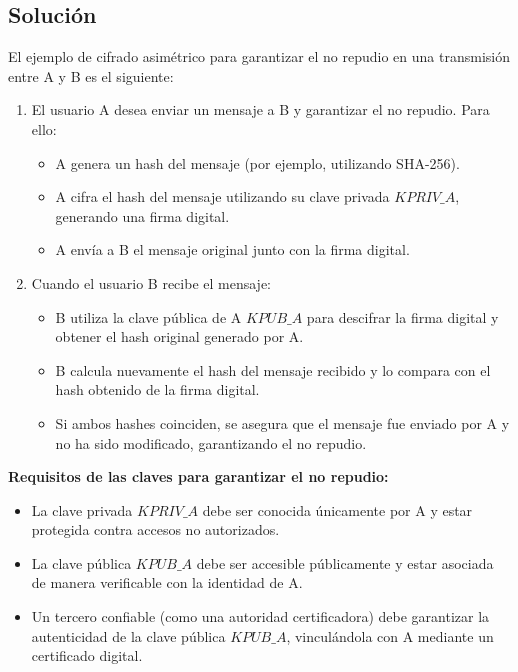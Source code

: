 \documentclass[12pt]{article}
\begin{document}
\subsection{Solución}
El ejemplo de cifrado asimétrico para garantizar el no repudio en una transmisión entre A y B es el siguiente:

\begin{enumerate}
    \item El usuario A desea enviar un mensaje a B y garantizar el no repudio. Para ello:
    \begin{itemize}
        \item A genera un hash del mensaje (por ejemplo, utilizando SHA-256).
        \item A cifra el hash del mensaje utilizando su clave privada \( KPRIV\_A \), generando una firma digital.
        \item A envía a B el mensaje original junto con la firma digital.
    \end{itemize}
    \item Cuando el usuario B recibe el mensaje:
    \begin{itemize}
        \item B utiliza la clave pública de A \( KPUB\_A \) para descifrar la firma digital y obtener el hash original generado por A.
        \item B calcula nuevamente el hash del mensaje recibido y lo compara con el hash obtenido de la firma digital.
        \item Si ambos hashes coinciden, se asegura que el mensaje fue enviado por A y no ha sido modificado, garantizando el no repudio.
    \end{itemize}
\end{enumerate}

\textbf{Requisitos de las claves para garantizar el no repudio:}
\begin{itemize}
    \item La clave privada \( KPRIV\_A \) debe ser conocida únicamente por A y estar protegida contra accesos no autorizados.
    \item La clave pública \( KPUB\_A \) debe ser accesible públicamente y estar asociada de manera verificable con la identidad de A.
    \item Un tercero confiable (como una autoridad certificadora) debe garantizar la autenticidad de la clave pública \( KPUB\_A \), vinculándola con A mediante un certificado digital.
\end{itemize}
\end{document}
